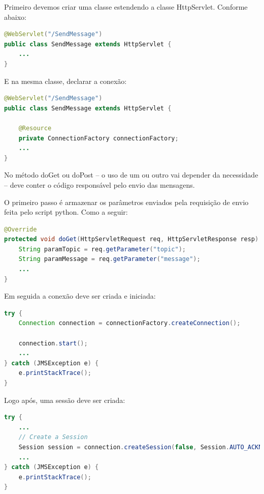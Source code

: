 Primeiro devemos criar uma classe estendendo a classe HttpServlet. Conforme abaixo: \\

\begin{lstlisting}[language=java]
@WebServlet("/SendMessage")
public class SendMessage extends HttpServlet {
	...
}
\end{lstlisting}

E na mesma classe, declarar a conexão: \\

\begin{lstlisting}[language=java]
@WebServlet("/SendMessage")
public class SendMessage extends HttpServlet {

	@Resource
	private ConnectionFactory connectionFactory;
	...
}
\end{lstlisting}

No método doGet ou doPost -- o uso de um ou outro vai depender da necessidade -- deve conter o código responsável pelo envio das mensagens.

O primeiro passo é armazenar os parâmetros enviados pela requisição de envio feita pelo script python. Como a seguir: \\   

\begin{lstlisting}[language=java]
@Override
protected void doGet(HttpServletRequest req, HttpServletResponse resp) throws ServletException, IOException {
	String paramTopic = req.getParameter("topic");
	String paramMessage = req.getParameter("message");
	...
}
\end{lstlisting}

Em seguida a conexão deve ser criada e iniciada: \\

\begin{lstlisting}[language=java]
try {
	Connection connection = connectionFactory.createConnection();

	connection.start();
	...
} catch (JMSException e) {
	e.printStackTrace();
}
\end{lstlisting}

Logo após, uma sessão deve ser criada: \\

\begin{lstlisting}[language=java]
try {
	...
	// Create a Session
	Session session = connection.createSession(false, Session.AUTO_ACKNOWLEDGE);
	...
} catch (JMSException e) {
	e.printStackTrace();
}
\end{lstlisting}

